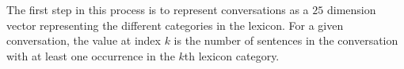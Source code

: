 \documentclass[letterpaper]{article} %
\newcommand{\kibitz}[2]{\ifnum\Comments=1{\textcolor{#1}{#2}}\fi}
\newcommand{\kg}[1]{\kibitz{red}{[KG:#1]}}
\begin{document}



The first step in this process is to represent  conversations as a $25$ dimension vector representing the different categories in the lexicon. 
For a given conversation, the value at index  $k$ is the number of sentences in the conversation with at least one occurrence in the \(k\)th lexicon category.
\end{document}

